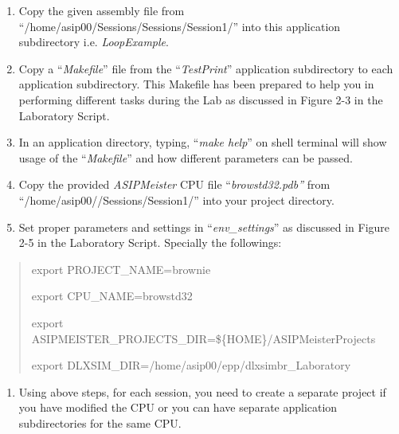 \documentclass[
]{article}
\begin{document}
\begin{enumerate}
\def\labelenumi{\arabic{enumi}.}
\setcounter{enumi}{2}
\item
  Copy the given assembly file from
  ``/home/asip00/Sessions/Sessions/Session1/'' into this application
  subdirectory i.e. \emph{LoopExample}.
\item
  Copy a ``\emph{Makefile}'' file from the ``\emph{TestPrint}''
  application subdirectory to each application subdirectory. This
  Makefile has been prepared to help you in performing different tasks
  during the Lab as discussed in Figure 2-3 in the Laboratory Script.
\item
  In an application directory, typing, ``\emph{make help}'' on shell
  terminal will show usage of the ``\emph{Makefile}'' and how different
  parameters can be passed.
\item
  Copy the provided \emph{ASIPMeister} CPU file ``\emph{browstd32.pdb''}
  from ``/home/asip00//Sessions/Session1/'' into your project directory.
\item
  Set proper parameters and settings in ``\emph{env\_settings}'' as
  discussed in Figure 2-5 in the Laboratory Script. Specially the
  followings:
\end{enumerate}

\begin{quote}
export PROJECT\_NAME=brownie

export CPU\_NAME=browstd32

export ASIPMEISTER\_PROJECTS\_DIR=\$\{HOME\}/ASIPMeisterProjects

export DLXSIM\_DIR=/home/asip00/epp/dlxsimbr\_Laboratory
\end{quote}

\begin{enumerate}
\def\labelenumi{\arabic{enumi}.}
\setcounter{enumi}{7}
\item
  Using above steps, for each session, you need to create a separate
  project if you have modified the CPU or you can have separate
  application subdirectories for the same CPU.
\end{enumerate}
\end{document}
